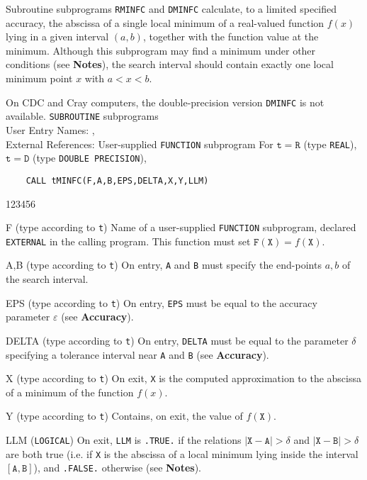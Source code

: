                     
                 
\Submitter{}                          
Subroutine subprograms {\tt RMINFC} and {\tt DMINFC} calculate,
to a limited specified accuracy, the abscissa of a single local minimum
of a real-valued function $f(x)$ lying in a given interval $(a,b)$,
together with the function value at the minimum. Although this
subprogram may find a minimum under other conditions (see {\bf Notes}),
the search interval should contain exactly one local minimum point $x$
with $a<x<b$.
\par
On CDC and Cray computers, the double-precision version {\tt DMINFC}
is not available.
\Structure
{\tt SUBROUTINE} subprograms \\
User Entry  Names: ,  \\
External References: User-supplied {\tt FUNCTION} subprogram
\Usage
For $\mathtt{t=R}$ (type {\tt REAL}), $\mathtt{t=D}$ (type
{\tt DOUBLE PRECISION}),
\begin{verbatim}
    CALL tMINFC(F,A,B,EPS,DELTA,X,Y,LLM)
\end{verbatim}
\begin{DLtt}{123456}
\item[F] (type according to {\tt t}) Name of a user-supplied
{\tt FUNCTION} subprogram, declared {\tt EXTERNAL} in the calling
program. This function must set $\mathtt{F(X)}=f(\mathtt{X})$.
\item[A,B] (type according to {\tt t}) On entry, {\tt A} and {\tt B}
must specify the end-points $a,b$ of the search interval.
\item[EPS] (type according to {\tt t}) On entry, {\tt EPS} must be
equal to the accuracy parameter $\varepsilon$ (see {\bf Accuracy}).
\item[DELTA] (type according to {\tt t}) On entry, {\tt DELTA} must
be equal to the parameter $\delta$ specifying a tolerance interval
near {\tt A} and {\tt B} (see {\bf Accuracy}).
\item[X] (type according to {\tt t}) On exit, {\tt X} is the computed
approximation to the abscissa of a minimum of the function $f(x)$.
\item[Y] (type according to {\tt t})
Contains, on exit, the value of $f(\mathtt{X})$.
\item[LLM] ({\tt LOGICAL}) On exit, {\tt LLM} is {\tt .TRUE.} if
the relations $\mathtt{|X-A|}>\delta$ and $\mathtt{|X-B|}>\delta$
are both true (i.e. if {\tt X} is the abscissa of a local minimum
lying inside the interval $\mathtt{[A,B]}$), and {\tt .FALSE.}
otherwise (see {\bf Notes}).
\end{DLtt}
